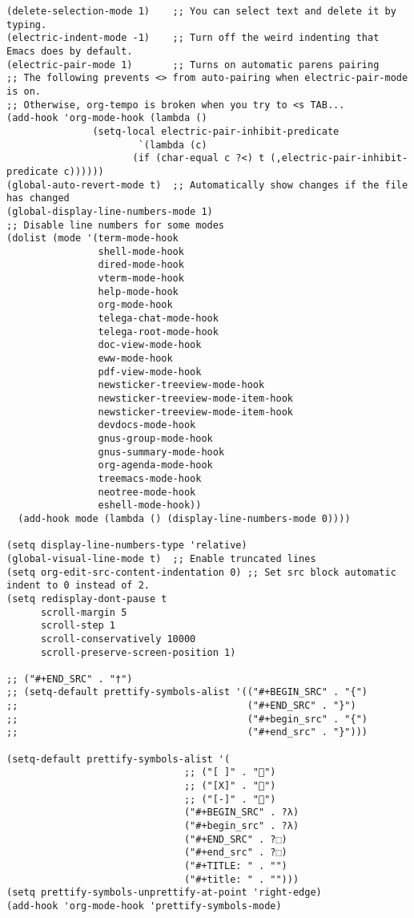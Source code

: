 \documentclass[11pt]{article}
\begin{document}
\begin{verbatim}
(delete-selection-mode 1)    ;; You can select text and delete it by typing.
(electric-indent-mode -1)    ;; Turn off the weird indenting that Emacs does by default.
(electric-pair-mode 1)       ;; Turns on automatic parens pairing
;; The following prevents <> from auto-pairing when electric-pair-mode is on.
;; Otherwise, org-tempo is broken when you try to <s TAB...
(add-hook 'org-mode-hook (lambda ()
               (setq-local electric-pair-inhibit-predicate
                       `(lambda (c)
                      (if (char-equal c ?<) t (,electric-pair-inhibit-predicate c))))))
(global-auto-revert-mode t)  ;; Automatically show changes if the file has changed
(global-display-line-numbers-mode 1)
;; Disable line numbers for some modes
(dolist (mode '(term-mode-hook
                shell-mode-hook
                dired-mode-hook
                vterm-mode-hook
                help-mode-hook
                org-mode-hook
                telega-chat-mode-hook
                telega-root-mode-hook
                doc-view-mode-hook
                eww-mode-hook
                pdf-view-mode-hook
                newsticker-treeview-mode-hook
                newsticker-treeview-mode-item-hook
                newsticker-treeview-mode-item-hook
                devdocs-mode-hook
                gnus-group-mode-hook
                gnus-summary-mode-hook
                org-agenda-mode-hook
                treemacs-mode-hook
                neotree-mode-hook
                eshell-mode-hook))
  (add-hook mode (lambda () (display-line-numbers-mode 0))))

(setq display-line-numbers-type 'relative)
(global-visual-line-mode t)  ;; Enable truncated lines
(setq org-edit-src-content-indentation 0) ;; Set src block automatic indent to 0 instead of 2.
(setq redisplay-dont-pause t
      scroll-margin 5
      scroll-step 1
      scroll-conservatively 10000
      scroll-preserve-screen-position 1)

;; ("#+END_SRC" . "†")
;; (setq-default prettify-symbols-alist '(("#+BEGIN_SRC" . "{")
;;                                        ("#+END_SRC" . "}")
;;                                        ("#+begin_src" . "{")
;;                                        ("#+end_src" . "}")))

(setq-default prettify-symbols-alist '(
                               ;; ("[ ]" . "")
                               ;; ("[X]" . "")
                               ;; ("[-]" . "")
                               ("#+BEGIN_SRC" . ?λ)
                               ("#+begin_src" . ?λ)
                               ("#+END_SRC" . ?⬚)
                               ("#+end_src" . ?⬚)
                               ("#+TITLE: " . "")
                               ("#+title: " . "")))
(setq prettify-symbols-unprettify-at-point 'right-edge)
(add-hook 'org-mode-hook 'prettify-symbols-mode)


\end{verbatim}
\end{document}
